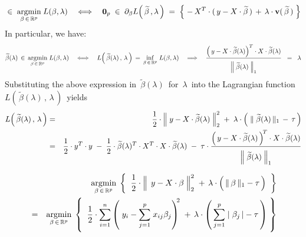 \begin{lemma}
\begin{enumerate}
\begin{equation*}
	\; \in \;
		\underset{\beta\,\in\,\Re^{p}}{\argmin}\;L(\beta,\lambda)
	\quad\Longleftrightarrow\quad
	\mathbf{0}_{p}
	\; \in \;
		\partial_{\beta} L\!\left(\,\widetilde{\beta}\,,\lambda\,\right)
	\; = \;
		\left\{\;
			- \, X^{T} \cdot (\,y - X \cdot \widetilde{\beta}\,)
			\, \overset{{\color{white}.}}{+} \,
			\lambda\cdot\mathbf{v}(\,\widetilde{\beta}\,)
			\;\right\}
	\end{equation*}
	\vskip 0.2cm
	In particular, we have:
	\begin{equation*}
	\widetilde{\beta}(\lambda)\,\in\,\underset{\beta\,\in\,\Re^{p}}{\argmin}\;L(\beta,\lambda)
	\quad\Longleftrightarrow\quad
		L\!\left(\,\widetilde{\beta}(\lambda)\,,\,\lambda\,\right)
		\,=\,
		\underset{\beta\,\in\,\Re^{p}}{\inf}\;L(\beta,\lambda)
	\quad\Longrightarrow\quad
		\dfrac{
			\left(\,y - X\cdot\widetilde{\beta}(\lambda)\right)^{T} \cdot X \cdot \widetilde{\beta}(\lambda)
			}{
			\overset{{\color{white}.}}{\left\Vert\;\widetilde{\beta}(\lambda)\;\right\Vert_{1}}
			}
		\;\; = \;\;
			\lambda
	\end{equation*}
	Substituting the above expression in
	\,$\widetilde{\beta}(\lambda)$\, for \,$\lambda$\,
	into the Lagrangian function
	\,$L\!\left(\,\widetilde{\beta}(\lambda)\,,\,\lambda\,\right)$\,
	yields
	\begin{eqnarray*}
	L\!\left(\,\widetilde{\beta}(\lambda)\,,\,\lambda\,\right)
	& = &
		\dfrac{1}{2}\cdot
		\left\Vert\;y - X\cdot\widetilde{\beta}(\lambda)\;\right\Vert^{2}_{2}
		\; + \;
		\lambda\cdot
		\left(\;\Vert\;\widetilde{\beta}(\lambda)\,\Vert_{1} \,-\, \tau\,\right)
	\\
	& = &
		\dfrac{1}{2} \cdot y^{T} \cdot y
		\; - \;
		\overset{{\color{white}1}}{\dfrac{1}{2}}
		\cdot
		\widetilde{\beta}(\lambda)^{T} \cdot X^{T} \cdot X \cdot \widetilde{\beta}(\lambda)
		\; - \;
		\tau\cdot
		\dfrac{
			\left(\, y - X\cdot\widetilde{\beta}(\lambda)\,\right)^{\!T} \cdot X \cdot \widetilde{\beta}(\lambda)
			}{
			\overset{{\color{white}.}}{\left\Vert\;\widetilde{\beta}(\lambda)\;\right\Vert_{1}}
			}
	\end{eqnarray*}
\end{enumerate}
\begin{eqnarray*}
&&
	\underset{\beta\,\in\,\Re^{p}}{\argmin}\;
	\left\{\;\;
		\dfrac{1}{2}
		\cdot
		\left\Vert\;\, y \overset{{\color{white}.}}{-} X\cdot\beta \;\right\Vert_{2}^{2}
		\; + \,
		\lambda\cdot\left(\,\Vert\,\beta\,\Vert_{1} \overset{{\color{white}.}}{-} \tau\,\right)
		\;\;\right\}
\\
& = &
	\underset{\beta\,\in\,\Re^{p}}{\argmin}\;
	\left\{\;\;
		\dfrac{1}{2}
		\cdot
		\overset{n}{\underset{i=1}{\sum}}
		\left(\; y_{i} - \overset{p}{\underset{j=1}{\sum}}\;x_{ij}\beta_{j}\right)^{\!\!2}
		\; + \,
		\lambda\cdot
		\left(\,
			\overset{p}{\underset{j=1}{\sum}}\;\vert\;\beta_{j}\,\vert - \tau
			\,\right)
		\;\right\}
\end{eqnarray*}
\end{lemma}

